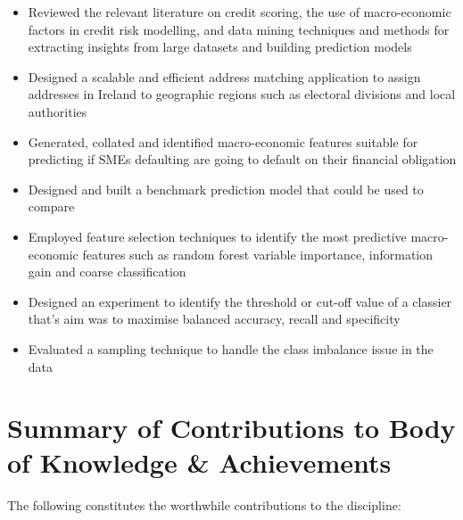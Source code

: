 \begin{itemize}
	\item Reviewed the relevant literature on credit scoring, the use of macro-economic factors in credit risk modelling, and data mining techniques and methods for extracting insights from large datasets and building prediction models
	\item Designed a scalable and efficient address matching application to assign addresses in Ireland to geographic regions such as electoral divisions and local authorities
	\item Generated, collated and identified macro-economic features suitable for predicting if SMEs defaulting are going to default on their financial obligation
	\item Designed and built a benchmark prediction model that could be used to compare
	\item Employed feature selection techniques to identify the most predictive macro-economic features such as random forest variable importance, information gain and coarse classification
	\item Designed an experiment to identify the threshold or cut-off value of a classier that's aim was to maximise balanced accuracy, recall and specificity 
	\item Evaluated a sampling technique to handle the class imbalance issue in the data
\end{itemize}





\section{Summary of Contributions to Body of Knowledge \& Achievements}

The following constitutes the worthwhile contributions to the discipline:

